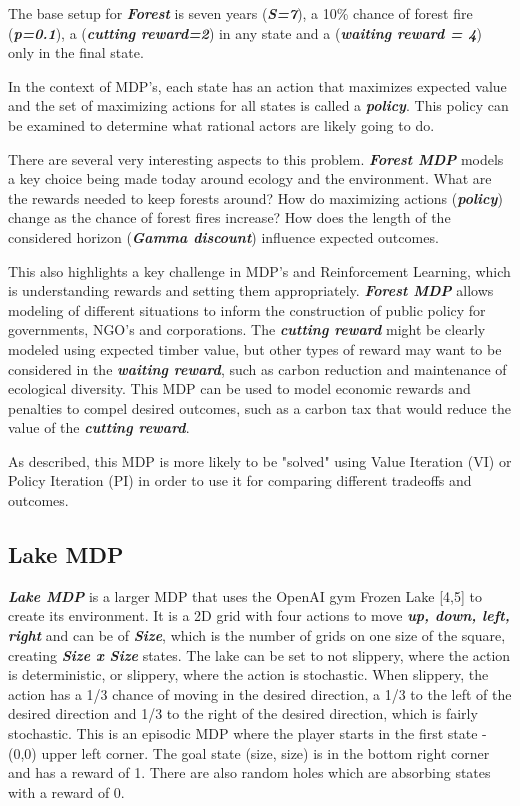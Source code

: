 \documentclass[letterpaper]{article} %
\begin{document}
The base setup for \textbf{\emph{Forest}} is seven years (\textbf{\emph{S=7}}), a 10\% chance of forest fire (\textbf{\emph{p=0.1}}), a  (\textbf{\emph{cutting reward=2}}) in any state and a (\textbf{\emph{waiting reward = 4}}) only in the final state.

In the context of MDP's, each state has an action that maximizes expected value and the set of maximizing actions for all states is called a \textbf{\emph{policy}}.  This policy can be examined to determine what rational actors are likely going to do. 

There are several very interesting aspects to this problem.  \textbf{\emph{Forest MDP}} models a key choice being made today around ecology and the environment.  What are the rewards needed to keep forests around?  How do maximizing actions (\textbf{\emph{policy}}) change as the chance of forest fires increase?  How does the length of the considered horizon (\textbf{\emph{Gamma discount}}) influence expected outcomes.  

This also highlights a key challenge in MDP's and Reinforcement Learning, which is understanding rewards and setting them appropriately.  \textbf{\emph{Forest MDP}}  allows modeling of different situations to inform the construction of public policy for governments, NGO's and corporations.  The \textbf{\emph{cutting reward}} might be clearly modeled using expected timber value, but other types of reward may want to be considered in the \textbf{\emph{waiting reward}}, such as carbon reduction and maintenance of ecological diversity.  This MDP can be used to model economic rewards and penalties to compel desired outcomes, such as a carbon tax that would reduce the value of the \textbf{\emph{cutting reward}}.

As described, this MDP is more likely to be "solved" using Value Iteration (VI) or Policy Iteration (PI) in order to use it for comparing different tradeoffs and outcomes.

\subsection{Lake MDP}
\textbf{\emph{Lake MDP}} is a larger MDP that uses the OpenAI gym Frozen Lake [4,5] to create its environment.   It is a 2D grid with four actions to move \textbf{\emph{up, down, left, right}} and can be of \textbf{\emph{Size}}, which is the number of grids on one size of the square, creating \textbf{\emph{Size x Size}} states.  The lake can be set to not slippery, where the action is deterministic, or slippery, where the action is stochastic.  When slippery, the action has a 1/3 chance of moving in the desired direction, a 1/3 to the left of the desired direction and 1/3 to the right of the desired direction, which is fairly stochastic.  This is an episodic MDP where the player starts in the first state - (0,0) upper left corner.  The goal state (size, size) is in the bottom right corner and has a reward of 1.  There are also random holes which are absorbing states with a reward of 0.
\end{document}
